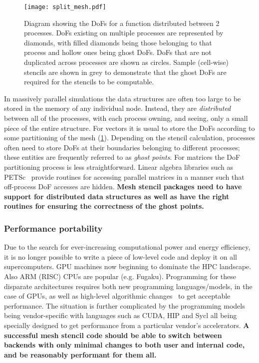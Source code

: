 \documentclass[thesis]{subfiles}
\begin{document}
\begin{figure}
  \centering
  \texttt{[image: split\_mesh.pdf]}
  \caption{
    Diagram showing the DoFs for a function distributed between 2 processes.
    DoFs existing on multiple processes are represented by diamonds, with filled diamonds being those belonging to that process and hollow ones being ghost DoFs.
    DoFs that are not duplicated across processes are shown as circles.
    Sample (cell-wise) stencils are shown in grey to demonstrate that the ghost DoFs are required for the stencils to be computable.
  }
  \label{fig:pyop2_split_mesh}
\end{figure}

In massively parallel simulations the data structures are often too large to be stored in the memory of any individual node.
Instead, they are \textit{distributed} between all of the processes, with each process owning, and seeing, only a small piece of the entire structure.
For vectors it is usual to store the DoFs according to some partitioning of the mesh (\cref{fig:pyop2_split_mesh}).
Depending on the stencil calculation, processes often need to store DoFs at their boundaries belonging to different processes; these entities are frequently referred to as \textit{ghost points}.
For matrices the DoF partitioning process is less straightforward.
Linear algebra libraries such as PETSc~\cite{petsc-user-ref,petsc-web-page,petsc-efficient} provide routines for accessing parallel matrices in a manner such that off-process DoF accesses are hidden.
\textbf{Mesh stencil packages need to have support for distributed data structures as well as have the right routines for ensuring the correctness of the ghost points.}

\subsubsection{Performance portability}


Due to the search for ever-increasing computational power and energy efficiency, it is no longer possible to write a piece of low-level code and deploy it on all supercomputers.
GPU machines now beginning to dominate the HPC landscape.
Also ARM (RISC) CPUs are popular (e.g. Fugaku).
Programming for these disparate architectures requires both new programming languages/models, in the case of GPUs, as well as high-level algorithmic changes~\cite{betteridgeCodeGenerationProductive2021} to get acceptable performance.
The situation is further complicated by the programming models being vendor-specific with languages such as CUDA, HIP and Sycl all being specially designed to get performance from a particular vendor's accelerators.
\textbf{A successful mesh stencil code should be able to switch between backends with only minimal changes to both user and internal code, and be reasonably performant for them all.}
\end{document}
